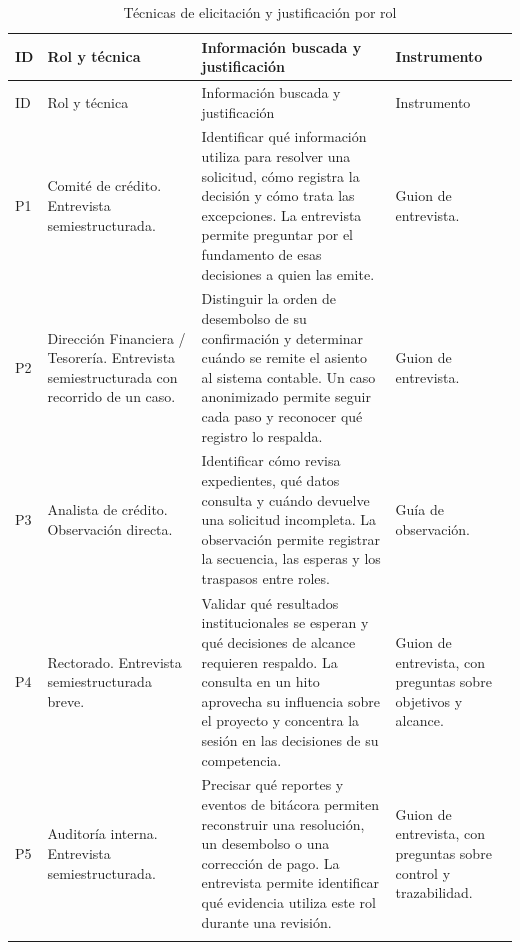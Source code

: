 \documentclass[11pt,a4paper]{article}
\begin{document}
\begingroup
\small
\setlength{\tabcolsep}{4pt}
\begin{longtable}{@{}L{.06}L{.24}L{.44}L{.19}@{}}
\caption{Técnicas de elicitación y justificación por rol}\label{tab:tecnicas}\\
\toprule
ID & Rol y técnica & Información buscada y justificación & Instrumento \\
\midrule
\endfirsthead
\toprule
ID & Rol y técnica & Información buscada y justificación & Instrumento \\
\midrule
\endhead
\bottomrule
\endfoot

P1 & Comité de crédito. Entrevista semiestructurada.
& Identificar qué información utiliza para resolver una solicitud,
cómo registra la decisión y cómo trata las excepciones. La entrevista
permite preguntar por el fundamento de esas decisiones a quien las emite.
& Guion de entrevista. \\
\addlinespace

P2 & Dirección Financiera / Tesorería. Entrevista semiestructurada
con recorrido de un caso.
& Distinguir la orden de desembolso de su confirmación y determinar
cuándo se remite el asiento al sistema contable. Un caso anonimizado
permite seguir cada paso y reconocer qué registro lo respalda.
& Guion de entrevista. \\
\addlinespace

P3 & Analista de crédito. Observación directa.
& Identificar cómo revisa expedientes, qué datos consulta y cuándo
devuelve una solicitud incompleta. La observación permite registrar
la secuencia, las esperas y los traspasos entre roles.
& Guía de observación. \\
\addlinespace

P4 & Rectorado. Entrevista semiestructurada breve.
& Validar qué resultados institucionales se esperan y qué decisiones
de alcance requieren respaldo. La consulta en un hito aprovecha su
influencia sobre el proyecto y concentra la sesión en las decisiones
de su competencia.
& Guion de entrevista, con preguntas sobre objetivos y alcance. \\
\addlinespace

P5 & Auditoría interna. Entrevista semiestructurada.
& Precisar qué reportes y eventos de bitácora permiten reconstruir
una resolución, un desembolso o una corrección de pago. La entrevista
permite identificar qué evidencia utiliza este rol durante una revisión.
& Guion de entrevista, con preguntas sobre control y trazabilidad. \\
\addlinespace


\end{longtable}
\end{document}
